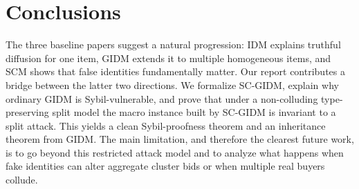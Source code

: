 \documentclass[sigconf]{aamas}
\theoremstyle{definition}
\theoremstyle{remark}
\begin{document}
\section{Conclusions}
The three baseline papers suggest a natural progression: IDM explains truthful diffusion for one item, GIDM extends it to multiple homogeneous items, and SCM shows that false identities fundamentally matter. Our report contributes a bridge between the latter two directions. We formalize SC-GIDM, explain why ordinary GIDM is Sybil-vulnerable, and prove that under a non-colluding type-preserving split model the macro instance built by SC-GIDM is invariant to a split attack. This yields a clean Sybil-proofness theorem and an inheritance theorem from GIDM. The main limitation, and therefore the clearest future work, is to go beyond this restricted attack model and to analyze what happens when fake identities can alter aggregate cluster bids or when multiple real buyers collude.

\appendix
\end{document}

